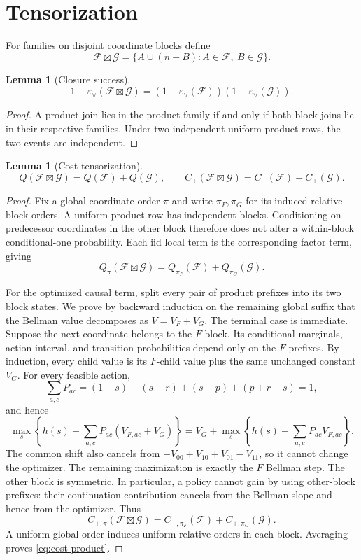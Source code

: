 \documentclass[11pt]{article}
\newtheorem{lemma}[theorem]{Lemma}
\theoremstyle{remark}
\newcommand{\F}{\mathcal F}
\newcommand{\G}{\mathcal G}
\newcommand{\eps}{\varepsilon}
\newcommand{\boxprod}{\mathbin{\boxtimes}}
\begin{document}
\section{Tensorization}

For families on disjoint coordinate blocks define
\[
 \F\boxprod\G=\{A\cup(n+B):A\in\F,\ B\in\G\}.
\]

\begin{lemma}[Closure success]
\begin{equation}
 1-\eps_\vee(\F\boxprod\G)
 =(1-\eps_\vee(\F))(1-\eps_\vee(\G)).
 \label{eq:defect-product}
\end{equation}
\end{lemma}
\begin{proof}
A product join lies in the product family if and only if both block joins lie
in their respective families.  Under two independent uniform product rows,
the two events are independent.
\end{proof}

\begin{lemma}[Cost tensorization]
\begin{equation}
 Q(\F\boxprod\G)=Q(\F)+Q(\G),\qquad
 C_+(\F\boxprod\G)=C_+(\F)+C_+(\G).
 \label{eq:cost-product}
\end{equation}
\end{lemma}
\begin{proof}
Fix a global coordinate order $\pi$ and write $\pi_F,\pi_G$ for its induced
relative block orders.  A uniform product row has independent blocks.
Conditioning on predecessor coordinates in the other block therefore does not
alter a within-block conditional-one probability.  Each iid local term is the
corresponding factor term, giving
\[
 Q_\pi(\F\boxprod\G)=Q_{\pi_F}(\F)+Q_{\pi_G}(\G).
\]

For the optimized causal term, split every pair of product prefixes into its
two block states.  We prove by backward induction on the remaining global
suffix that the Bellman value decomposes as $V=V_F+V_G$.  The terminal case is
immediate.  Suppose the next coordinate belongs to the $F$ block.  Its
conditional marginals, action interval, and transition probabilities depend
only on the $F$ prefixes.  By induction, every child value is its $F$-child
value plus the same unchanged constant $V_G$.  For every feasible action,
\[
 \sum_{a,c}P_{ac}
 =(1-s)+(s-r)+(s-p)+(p+r-s)=1,
\]
and hence
\[
 \max_s\left\{h(s)+\sum_{a,c}P_{ac}(V_{F,ac}+V_G)\right\}
 =V_G+\max_s\left\{h(s)+\sum_{a,c}P_{ac}V_{F,ac}\right\}.
\]
The common shift also cancels from
$-V_{00}+V_{10}+V_{01}-V_{11}$, so it cannot change the optimizer.  The
remaining maximization is exactly the $F$ Bellman step.  The other block is
symmetric.  In particular, a policy cannot gain by
using other-block prefixes: their continuation contribution cancels from the
Bellman slope and hence from the optimizer.  Thus
\[
 C_{+,\pi}(\F\boxprod\G)
 =C_{+,\pi_F}(\F)+C_{+,\pi_G}(\G).
\]
A uniform global order induces uniform relative orders in each block.
Averaging proves \eqref{eq:cost-product}.
\end{proof}
\end{document}

